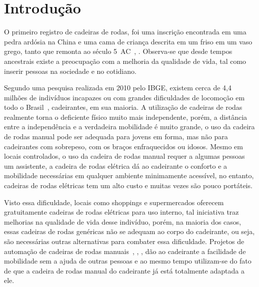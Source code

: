 \chapter[Introdução]{Introdução}

O primeiro registro de cadeiras de rodas, foi uma inscrição encontrada em uma pedra ardósia na China e uma cama de criança descrita em um friso em um vaso grego, tanto que remonta ao século 5~AC~\cite{joseph:puttingthewhee:2012}, \cite{maggie:whoinvented:2012}. Observa-se que desde tempos ancestrais existe a preocupação com a melhoria da qualidade de vida, tal como inserir pessoas na sociedade e no cotidiano. 

Segundo uma pesquisa realizada em 2010 pelo IBGE, existem cerca de 4,4 milhões de indivíduos incapazes ou com grandes dificuldades de locomoção em todo o Brasil~\cite{ibge:cartilha:2010}, cadeirantes, em sua maioria. A utilização de cadeiras de rodas realmente torna o deficiente físico muito mais independente, porém, a distância entre a independência e a verdadeira mobilidade é muito grande, o uso da cadeira de rodas manual pode ser adequada para jovens em forma, mas não para cadeirantes com sobrepeso, com os braços enfraquecidos ou idosos. Mesmo em locais controlados, o uso da cadeira de rodas manual requer a algumas pessoas um assistente, a cadeira de rodas elétrica dá ao cadeirante o conforto e a mobilidade necessárias em qualquer ambiente minimamente acessível, no entanto, cadeiras de rodas elétricas tem um alto custo e muitas vezes são pouco portáteis.

Visto essa dificuldade, locais como shoppings e supermercados oferecem gratuitamente cadeiras de rodas elétricas para uso interno, tal iniciativa traz melhorias na qualidade de vida desse indivíduo, porém, na maioria dos casos, essas cadeiras de rodas genéricas não se adequam ao corpo do cadeirante, ou seja, são necessárias outras alternativas para combater essa dificuldade. Projetos de automação de cadeiras de rodas manuais~\cite{brunel:wheelchair:2004}, \cite{artigo_rudi}, \cite{patent_cadeira_rodas_eletrica},	 \cite{marcos:controle:2002} dão ao cadeirante a facilidade de mobilidade sem a ajuda de outras pessoas e ao mesmo tempo utilizam-se do fato de que a cadeira de rodas manual do cadeirante já está totalmente adaptada a ele.

